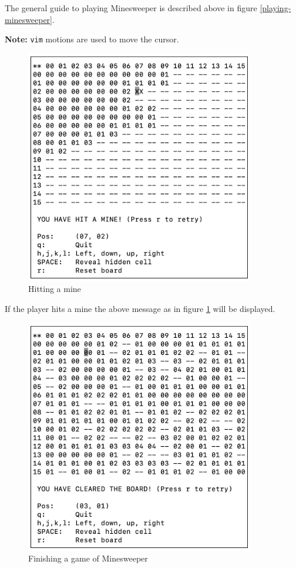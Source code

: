 \documentclass[12pt]{article}
\begin{document}
The general guide to playing Minesweeper is described above in
figure \ref{playing-minesweeper}.

\textbf{Note:} \texttt{vim} motions are used to move the cursor.

\begin{figure}[H]
    \centering
    \includegraphics[width=10cm]{./images/hitting-mine-minesweeper.png}
    \caption{Hitting a mine}
    \label{hitting-mine-minesweeper}
\end{figure}

If the player hits a mine the above message as in figure
\ref{hitting-mine-minesweeper} will be displayed.

\begin{figure}[H]
    \centering
    \includegraphics[width=10cm]{./images/finishing-minesweeper.png}
    \caption{Finishing a game of Minesweeper}
    \label{finishing-minesweeper}
\end{figure}
\end{document}
